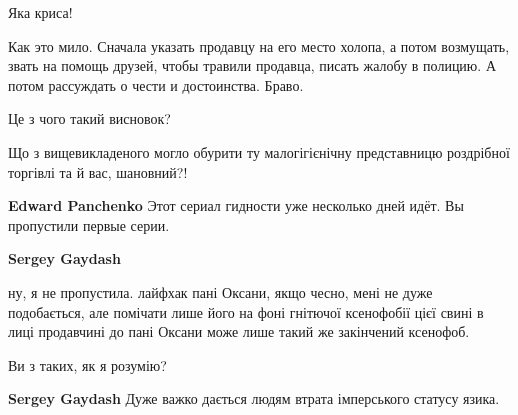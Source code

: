 \begin{itemize}
Яка криса!


Как это мило. Сначала указать продавцу на его место холопа, а потом возмущать,
звать на помощь друзей, чтобы травили продавца, писать жалобу в полицию. А
потом рассуждать о чести и достоинства. Браво.

\begin{itemize}
 
Це з чого такий висновок?

Що з вищевикладеного могло обурити ту малогігієнічну представницю роздрібної
торгівлі та й вас, шановний?!


 
\textbf{Edward Panchenko} Этот сериал гидности уже несколько дней идёт. Вы пропустили первые серии.

 
\textbf{Sergey Gaydash} 

ну, я не пропустила. лайфхак пані Оксани, якщо чесно, мені не дуже подобається,
але помічати лише його на фоні гнітючої ксенофобії цієї свині в лиці продавчині
до пані Оксани може лише такий же закінчений ксенофоб.

Ви з таких, як я розумію?

 
\textbf{Sergey Gaydash} Дуже важко дається людям втрата імперського статусу язика.

 

\end{itemize}
\end{itemize}
